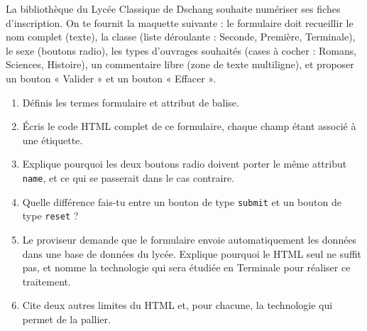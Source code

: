 \documentclass[11pt]{article}
\newcommand{\cle}[1]{{\popxbold\color{popdark}#1}}
\begin{document}
\begin{exercice}
La bibliothèque du Lycée Classique de Dschang souhaite numériser ses fiches d'inscription. On te fournit la maquette suivante : le formulaire doit recueillir le nom complet (texte), la classe (liste déroulante : Seconde, Première, Terminale), le sexe (boutons radio), les types d'ouvrages souhaités (cases à cocher : Romans, Sciences, Histoire), un commentaire libre (zone de texte multiligne), et proposer un bouton « Valider » et un bouton « Effacer ».
\begin{enumerate}
\item Définis les termes \cle{formulaire} et \cle{attribut de balise}.
\item Écris le code HTML complet de ce formulaire, chaque champ étant associé à une étiquette.
\item Explique pourquoi les deux boutons radio doivent porter le même attribut \texttt{name}, et ce qui se passerait dans le cas contraire.
\item Quelle différence fais-tu entre un bouton de type \texttt{submit} et un bouton de type \texttt{reset} ?
\item Le proviseur demande que le formulaire envoie automatiquement les données dans une base de données du lycée. Explique pourquoi le HTML seul ne suffit pas, et nomme la technologie qui sera étudiée en Terminale pour réaliser ce traitement.
\item Cite deux autres limites du HTML et, pour chacune, la technologie qui permet de la pallier.
\end{enumerate}
\end{exercice}
\end{document}

